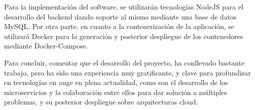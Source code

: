 Para la implementación del software, se utilizarán tecnologías NodeJS
para el desarrollo del backend dando soporte al mismo mediante una
base de datos MySQL. Por otra parte, en cuanto a la contenerización de
la aplicación, se utilizará Docker para la generación y posterior
despliegue\cite{InitMySQLDocker,MYSQL-DOckerHUB,Docean-docker,Docean-dockerCompose}
de los contenedores mediante Docker-Compose.

Para concluir, comentar que el desarrollo del proyecto, ha conllevado
bastante trabajo, pero ha sido una experiencia muy gratificante, y
clave para profundizar en tecnologías en auge en plena actualidad,
como son el desarrollo de los microservicios y la colaboración entre
ellos para dar solución a múltiples problemas, y su posterior
despliegue sobre arquitecturas cloud.

